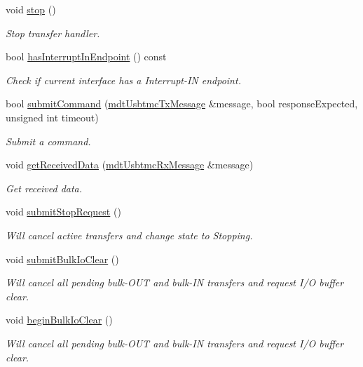 \begin{DoxyCompactItemize}
void \hyperlink{classmdt_usbtmc_transfer_handler_afa26a3493a8c66db38d20a7192b8ff68}{stop} ()
\begin{DoxyCompactList}\small\item\em Stop transfer handler. \end{DoxyCompactList}\item 
bool \hyperlink{classmdt_usbtmc_transfer_handler_ab8206aff7c466babcd308cce1c62c7ae}{has\-Interrupt\-In\-Endpoint} () const 
\begin{DoxyCompactList}\small\item\em Check if current interface has a Interrupt-\/\-I\-N endpoint. \end{DoxyCompactList}\item 
bool \hyperlink{classmdt_usbtmc_transfer_handler_a2ba256326fc2b6ca70816eb1cca783c9}{submit\-Command} (\hyperlink{classmdt_usbtmc_tx_message}{mdt\-Usbtmc\-Tx\-Message} \&message, bool response\-Expected, unsigned int timeout)
\begin{DoxyCompactList}\small\item\em Submit a command. \end{DoxyCompactList}\item 
void \hyperlink{classmdt_usbtmc_transfer_handler_aaa348472836fed8674266a81b0a9e0f4}{get\-Received\-Data} (\hyperlink{classmdt_usbtmc_rx_message}{mdt\-Usbtmc\-Rx\-Message} \&message)
\begin{DoxyCompactList}\small\item\em Get received data. \end{DoxyCompactList}\item 
void \hyperlink{classmdt_usbtmc_transfer_handler_acc1a517f0dd53740ed12264d713d137f}{submit\-Stop\-Request} ()
\begin{DoxyCompactList}\small\item\em Will cancel active transfers and change state to Stopping. \end{DoxyCompactList}\item 
void \hyperlink{classmdt_usbtmc_transfer_handler_ac39c042193f7705c80c738dbf109a8b2}{submit\-Bulk\-Io\-Clear} ()
\begin{DoxyCompactList}\small\item\em Will cancel all pending bulk-\/\-O\-U\-T and bulk-\/\-I\-N transfers and request I/\-O buffer clear. \end{DoxyCompactList}\item 
void \hyperlink{classmdt_usbtmc_transfer_handler_ae32000426c4f8d3c6cd0a833212fdbfd}{begin\-Bulk\-Io\-Clear} ()
\begin{DoxyCompactList}\small\item\em Will cancel all pending bulk-\/\-O\-U\-T and bulk-\/\-I\-N transfers and request I/\-O buffer clear. \end{DoxyCompactList}\item 

\end{DoxyCompactItemize}
